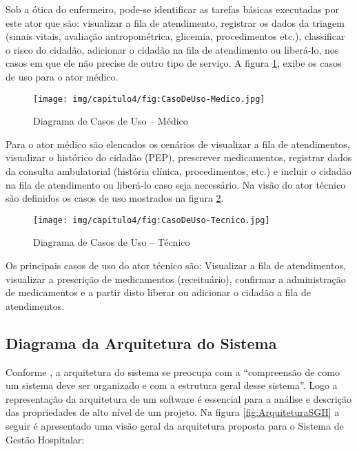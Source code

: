 Sob a ótica do enfermeiro, pode-se identificar as tarefas básicas executadas por este ator que são: visualizar a fila de atendimento,  registrar os dados da triagem (sinais vitais, avaliação antropométrica, glicemia, procedimentos etc.), classificar o risco do cidadão, adicionar o cidadão na fila de atendimento ou liberá-lo, nos casos em que ele não precise de outro tipo de serviço.  A figura \ref{fig:CasoDeUso-Medico}, exibe os casos de uso para o ator médico.

\begin{figure}[H]
    \centering
     \caption{Diagrama de Casos de Uso – Médico}
    \texttt{[image: img/capitulo4/fig:CasoDeUso-Medico.jpg]}
    \label{fig:CasoDeUso-Medico}
\end{figure}

Para o ator médico são elencados os cenários de visualizar a fila de atendimentos, visualizar o histórico do cidadão (PEP), prescrever medicamentos, registrar dados da consulta ambulatorial (história clínica, procedimentos, etc.) e incluir o cidadão na fila de atendimento ou liberá-lo caso seja necessário. Na visão do ator técnico são definidos os casos de uso mostrados na figura \ref{fig:CasoDeUso-Tecnico.jpg}.

\begin{figure}[H]
    \centering
     \caption{Diagrama de Casos de Uso – Técnico}
    \texttt{[image: img/capitulo4/fig:CasoDeUso-Tecnico.jpg]}
    \label{fig:CasoDeUso-Tecnico.jpg}
\end{figure}

Os principais casos de uso do ator técnico são: Visualizar a fila de atendimentos, visualizar a prescrição de medicamentos (receituário), confirmar a administração de medicamentos e a partir disto liberar ou adicionar o cidadão a fila de atendimentos.

\subsection{\textbf{Diagrama da Arquitetura do Sistema}}

Conforme , a arquitetura do sistema se preocupa com a ``compreensão de como um sistema deve ser organizado e com a estrutura geral desse sistema''. Logo a representação da arquitetura de um software é essencial para a análise e descrição das propriedades de alto nível de um projeto. Na figura \ref{fig:ArquiteturaSGH} a seguir é apresentado uma visão geral da arquitetura proposta para o Sistema de Gestão Hospitalar:


